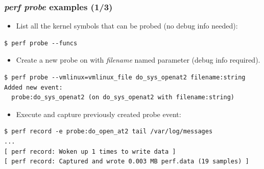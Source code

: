 \begin{frame}[fragile]
  \frametitle{{\em perf probe} examples (1/3)}
  \begin{itemize}
    \item List all the kernel symbols that can be probed (no debug info needed):
  \end{itemize}
  \begin{block}{}
    \begin{verbatim}
$ perf probe --funcs
    \end{verbatim}
  \end{block}
  \begin{itemize}
    \item Create a new probe on  with {\em filename}
          named parameter (debug info required).
  \end{itemize}
  \begin{block}{}
    \begin{verbatim}
$ perf probe --vmlinux=vmlinux_file do_sys_openat2 filename:string
Added new event:
  probe:do_sys_openat2 (on do_sys_openat2 with filename:string)
    \end{verbatim}
  \end{block}
  \begin{itemize}
    \item Execute  and capture previously created probe event:
  \end{itemize}
  \begin{block}{}
    \begin{verbatim}
$ perf record -e probe:do_open_at2 tail /var/log/messages
...
[ perf record: Woken up 1 times to write data ]
[ perf record: Captured and wrote 0.003 MB perf.data (19 samples) ]
    \end{verbatim}
  \end{block}
\end{frame}

